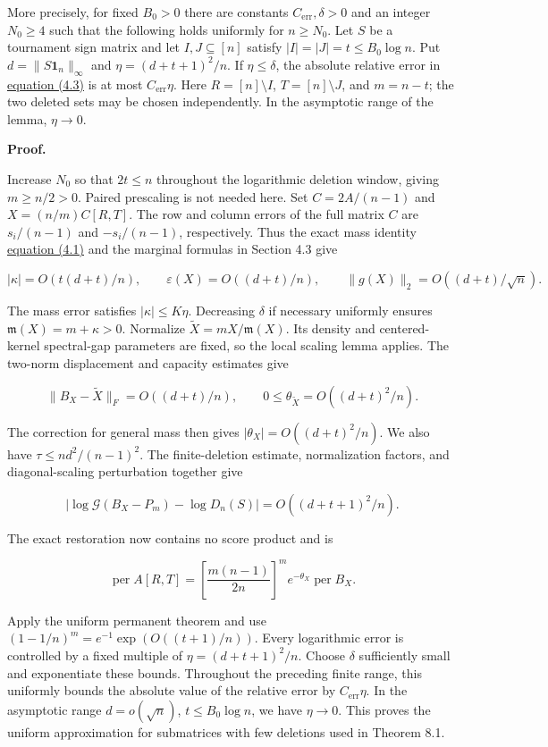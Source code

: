 \documentclass[11pt,a4paper]{article}
\begin{document}
More precisely, for fixed \(B_0>0\) there are constants \(C_{\mathrm{err}},\delta>0\) and an integer \(N_0\ge4\) such that the following holds uniformly for \(n\ge N_0\). Let \(S\) be a tournament sign matrix and let \(I,J\subseteq[n]\) satisfy \(|I|=|J|=t\le B_0\log n\). Put \(d=\|S\mathbf1_n\|_\infty\) and \(\eta=(d+t+1)^2/n\). If \(\eta\le\delta\), the absolute relative error in \hyperref[eq-small-score-permanent]{equation (4.3)} is at most \(C_{\mathrm{err}}\eta\). Here \(R=[n]\setminus I\), \(T=[n]\setminus J\), and \(m=n-t\); the two deleted sets may be chosen independently. In the asymptotic range of the lemma, \(\eta\to0\).

\textbf{Proof.}

Increase \(N_0\) so that \(2t\le n\) throughout the logarithmic deletion window, giving \(m\ge n/2>0\). Paired prescaling is not needed here. Set \(C=2A/(n-1)\) and \(X=(n/m)C[R,T]\). The row and column errors of the full matrix \(C\) are \(s_i/(n-1)\) and \(-s_i/(n-1)\), respectively. Thus the exact mass identity \hyperref[eq-deletion-mass]{equation (4.1)} and the marginal formulas in Section 4.3 give

\[
|\kappa|=O(t(d+t)/n),\qquad \varepsilon(X)=O((d+t)/n),\qquad \|g(X)\|_2=O((d+t)/\sqrt n).
\]

The mass error satisfies \(|\kappa|\le K\eta\). Decreasing \(\delta\) if necessary uniformly ensures \(\mathfrak m(X)=m+\kappa>0\). Normalize \(\widetilde X=mX/\mathfrak m(X)\). Its density and centered-kernel spectral-gap parameters are fixed, so the local scaling lemma applies. The two-norm displacement and capacity estimates give

\[
\|B_X-\widetilde X\|_F=O((d+t)/n),\qquad 0\le\theta_{\widetilde X}=O((d+t)^2/n).
\]

The correction for general mass then gives \(|\theta_X|=O((d+t)^2/n)\). We also have \(\tau\le nd^2/(n-1)^2\). The finite-deletion estimate, normalization factors, and diagonal-scaling perturbation together give

\[
|\log\mathcal G(B_X-P_m)-\log D_n(S)|=O((d+t+1)^2/n).
\]

The exact restoration now contains no score product and is

\[
\operatorname{per}A[R,T]=\left[\frac{m(n-1)}{2n}\right]^m e^{-\theta_X}\operatorname{per}B_X.
\]

Apply the uniform permanent theorem and use \((1-1/n)^m=e^{-1}\exp(O((t+1)/n))\). Every logarithmic error is controlled by a fixed multiple of \(\eta=(d+t+1)^2/n\). Choose \(\delta\) sufficiently small and exponentiate these bounds. Throughout the preceding finite range, this uniformly bounds the absolute value of the relative error by \(C_{\mathrm{err}}\eta\). In the asymptotic range \(d=o(\sqrt n)\), \(t\le B_0\log n\), we have \(\eta\to0\). This proves the uniform approximation for submatrices with few deletions used in Theorem 8.1.
\end{document}
